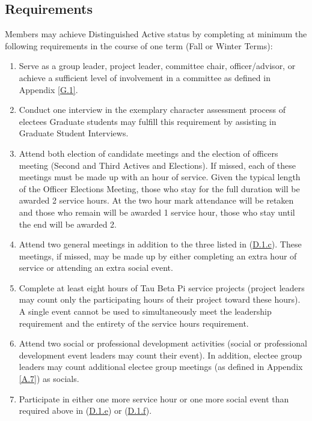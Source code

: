\subsection{Requirements} \label{D.1}

Members may achieve Distinguished Active status by
completing at minimum the following requirements in the course of one term (Fall or Winter
Terms):
\begin{enumerate}
    \item {}
    Serve as a group leader, project leader, committee chair, officer/advisor,
or achieve a sufficient level of involvement in a committee as defined in Appendix \ref{G.1}.
    \item {}
    Conduct one interview in the exemplary character assessment process
of electees Graduate students may fulfill this requirement by assisting in Graduate
Student Interviews.
    \item {}
    Attend both election of candidate meetings and the
election of officers meeting (Second and Third Actives and Elections). If missed, each
of these meetings must be made up with an hour of service. Given the typical length
of the Officer Elections Meeting, those who stay for the full duration will be awarded
2 service hours. At the two hour mark attendance will be retaken and those who
remain will be awarded 1 service hour, those who stay until the end will be awarded
2.
    \item {}
    Attend two general meetings in addition to the three listed
in (\hyperref[D.1.c]{D.1.c}). These meetings, if missed, may be made up by either completing an extra
hour of service or attending an extra social event.
    \item {}
    Complete at least eight hours of Tau Beta Pi service projects (project leaders
may count only the participating hours of their project toward these hours). A single
event cannot be used to simultaneously meet the leadership requirement and the
entirety of the service hours requirement.
    \item {}
    Attend two social or professional development
activities (social or professional development event leaders may count
their event). In addition, electee group leaders may count additional electee group
meetings (as defined in Appendix \ref{A.7}) as socials.
    \item {}
    Participate in either one more service hour or one more social event than
required above in (\hyperref[D.1.e]{D.1.e}) or (\hyperref[D.1.f]{D.1.f}).
\end{enumerate}


